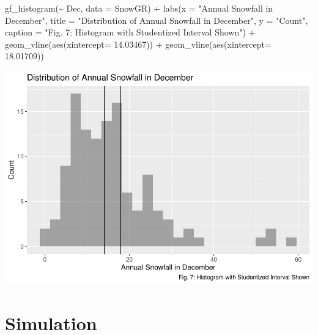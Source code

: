 \documentclass[12pt]{article}
\newenvironment{Shaded}{\begin{snugshade}}{\end{snugshade}}
\newcommand{\AttributeTok}[1]{\textcolor[rgb]{0.77,0.63,0.00}{#1}}
\newcommand{\FloatTok}[1]{\textcolor[rgb]{0.00,0.00,0.81}{#1}}
\newcommand{\FunctionTok}[1]{\textcolor[rgb]{0.00,0.00,0.00}{#1}}
\newcommand{\NormalTok}[1]{#1}
\newcommand{\SpecialCharTok}[1]{\textcolor[rgb]{0.00,0.00,0.00}{#1}}
\newcommand{\StringTok}[1]{\textcolor[rgb]{0.31,0.60,0.02}{#1}}
\begin{document}
\begin{Shaded}
\begin{Highlighting}[]
\FunctionTok{gf\_histogram}\NormalTok{(}\SpecialCharTok{\textasciitilde{}}\NormalTok{ Dec, }\AttributeTok{data =}\NormalTok{ SnowGR) }\SpecialCharTok{+}
  \FunctionTok{labs}\NormalTok{(}\AttributeTok{x =} \StringTok{"Annual Snowfall in December"}\NormalTok{, }
       \AttributeTok{title =} \StringTok{"Distribution of Annual Snowfall in December"}\NormalTok{, }\AttributeTok{y =} \StringTok{"Count"}\NormalTok{, }
       \AttributeTok{caption =} \StringTok{"Fig. 7: Histogram with Studentized Interval Shown"}\NormalTok{) }\SpecialCharTok{+}
  \FunctionTok{geom\_vline}\NormalTok{(}\FunctionTok{aes}\NormalTok{(}\AttributeTok{xintercept=} \FloatTok{14.03467}\NormalTok{)) }\SpecialCharTok{+}
  \FunctionTok{geom\_vline}\NormalTok{(}\FunctionTok{aes}\NormalTok{(}\AttributeTok{xintercept=} \FloatTok{18.01709}\NormalTok{)) }
\end{Highlighting}
\end{Shaded}

\includegraphics{paper_files/figure-latex/unnamed-chunk-19-1.pdf}

\hypertarget{simulation}{%
\section{Simulation}\label{simulation}}
\end{document}
